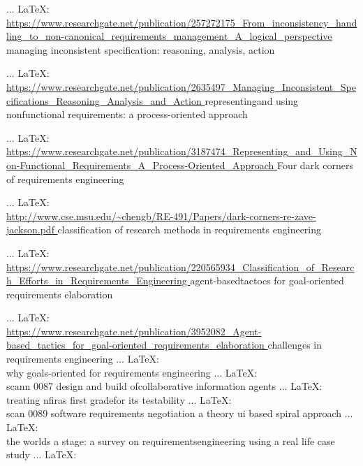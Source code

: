 \begin{thebibliography}{99}
 ... \LaTeX:\\ \url{https://www.researchgate.net/publication/257272175_From_inconsistency_handling_to_non-canonical_requirements_management_A_logical_perspective }
managing inconsistent specification: reasoning, analysis, action

 ... \LaTeX:\\ \url{https://www.researchgate.net/publication/2635497_Managing_Inconsistent_Specifications_Reasoning_Analysis_and_Action  }
representingand using nonfunctional requirements: a process-oriented approach

 ... \LaTeX:\\ \url{https://www.researchgate.net/publication/3187474_Representing_and_Using_Non-Functional_Requirements_A_Process-Oriented_Approach }
Four dark corners of requirements engineering

 ... \LaTeX:\\ \url{ http://www.cse.msu.edu/~chengb/RE-491/Papers/dark-corners-re-zave-jackson.pdf }
classification of research methods in requirements engineering

 ... \LaTeX:\\ \url{https://www.researchgate.net/publication/220565934_Classification_of_Research_Efforts_in_Requirements_Engineering }
agent-basedtactocs for goal-oriented requirements elaboration

\bibitem{ } ... \LaTeX:\\ \url{https://www.researchgate.net/publication/3952082_Agent-based_tactics_for_goal-oriented_requirements_elaboration }
challenges in requirements engineering
\bibitem{ } ... \LaTeX:\\ \url{ }
why goals-oriented for requirements engineering
\bibitem{ } ... \LaTeX:\\ \url{ }
scann 0087
design and build ofcollaborative information agents
\bibitem{ } ... \LaTeX:\\ \url{ }
treating nfiras first gradefor its testability
\bibitem{ } ... \LaTeX:\\ \url{ }
scan 0089
software requirements negotiation a theory ui based spiral approach
\bibitem{ } ... \LaTeX:\\ \url{ }
the worlds a stage: a survey on requirementsengineering using a real life case study
\bibitem{ } ... \LaTeX:\\ \url{ }


\end{thebibliography}
